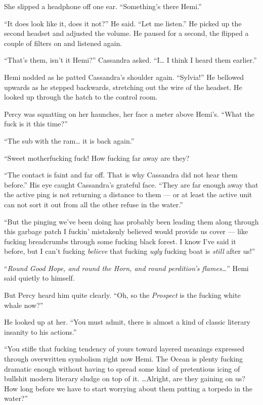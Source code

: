 \documentclass[
]{scrbook}
\begin{document}
She slipped a headphone off one ear. ``Something's there Hemi.''

``It does look like it, does it not?'' He said. ``Let me listen.'' He
picked up the second headset and adjusted the volume. He paused for a
second, the flipped a couple of filters on and listened again.

``That's them, isn't it Hemi?'' Cassandra asked. ``I\ldots{} I think I
heard them earlier.''

Hemi nodded as he patted Cassandra's shoulder again. ``Sylvia!'' He
bellowed upwards as he stepped backwards, stretching out the wire of the
headset. He looked up through the hatch to the control room.

Percy was squatting on her haunches, her face a meter above Hemi's.
``What the fuck is it this time?''

``The sub with the ram\ldots{} it is back again.''

``Sweet motherfucking fuck! How fucking far away are they?

``The contact is faint and far off. That is why Cassandra did not hear
them before.'' His eye caught Cassandra's grateful face. ``They are far
enough away that the active ping is not returning a distance to them ---
or at least the active unit can not sort it out from all the other
refuse in the water.''

``But the pinging we've been doing has probably been leading them along
through this garbage patch I fuckin' mistakenly believed would provide
us cover --- like fucking breadcrumbs through some fucking black forest.
I know I've said it before, but I can't fucking \emph{believe} that
fucking \emph{ugly} fucking boat is \emph{still} after us!''

``\emph{Round Good Hope, and round the Horn, and round perdition's
flames\ldots{}}'' Hemi said quietly to himself.

But Percy heard him quite clearly. ``Oh, so the \emph{Prospect} is the
fucking white whale now?''

He looked up at her. ``You must admit, there is almost a kind of classic
literary insanity to his actions.''

``You stifle that fucking tendency of yours toward layered meanings
expressed through overwritten symbolism right now Hemi. The Ocean is
plenty fucking dramatic enough without having to spread some kind of
pretentious icing of bullshit modern literary sludge on top of it.
\ldots Alright, are they gaining on us? How long before we have to start
worrying about them putting a torpedo in the water?''
\end{document}
